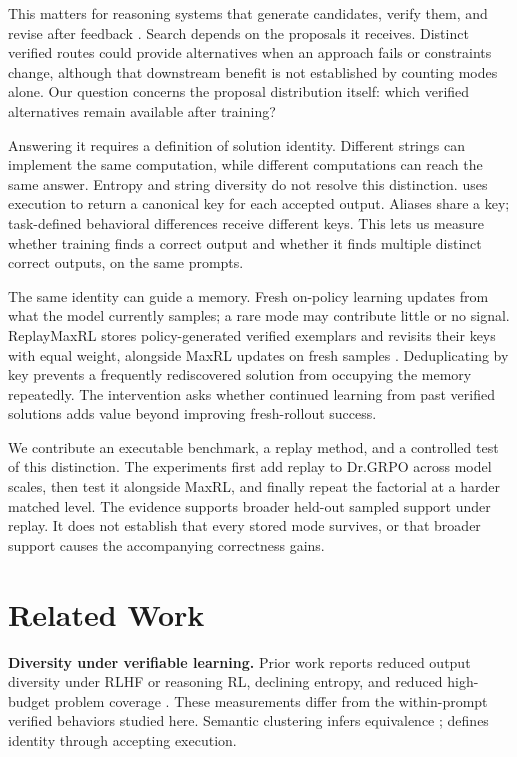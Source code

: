This matters for reasoning systems that generate candidates, verify them,
and revise after feedback \citep{brown2024monkeys,snell2024testtime}.
Search depends on the proposals it receives. Distinct verified routes could
provide alternatives when an approach fails or constraints change, although
that downstream benefit is not established by counting modes alone. Our
question concerns the proposal distribution itself: which verified
alternatives remain available after training?

Answering it requires a definition of solution identity. Different strings
can implement the same computation, while different computations can reach
the same answer. Entropy and string diversity do not resolve this distinction.
\mb{} uses execution to return a canonical key for each accepted output.
Aliases share a key; task-defined behavioral differences receive different
keys. This lets us measure whether training finds a correct output and
whether it finds multiple distinct correct outputs, on the same prompts.

The same identity can guide a memory. Fresh on-policy learning updates from
what the model currently samples; a rare mode may contribute little or no
signal. ReplayMaxRL stores policy-generated verified exemplars and revisits
their keys with equal weight, alongside MaxRL updates on fresh samples
\citep{tajwar2026maxrl}. Deduplicating by key prevents a frequently rediscovered
solution from occupying the memory repeatedly. The intervention asks whether
continued learning from past verified solutions adds value beyond improving
fresh-rollout success.

We contribute an executable benchmark, a replay method, and a controlled
test of this distinction. The experiments first add replay to Dr.GRPO across
model scales, then test it alongside MaxRL, and finally repeat the factorial
at a harder matched level. The evidence supports broader held-out sampled
support under replay. It does not establish that every stored mode survives,
or that broader support causes the accompanying correctness gains.

\section{Related Work}
\label{sec:related}

\noindent\textbf{Diversity under verifiable learning.}
Prior work reports reduced output diversity under RLHF or reasoning RL,
declining entropy, and reduced high-budget problem coverage
\citep{kirk2024understanding,dang2025diversity,cui2025entropy,yue2025rlvrlimit}.
These measurements differ from the within-prompt verified behaviors studied
here. Semantic clustering infers equivalence \citep{farquhar2024detecting};
\mb{} defines identity through accepting execution.

